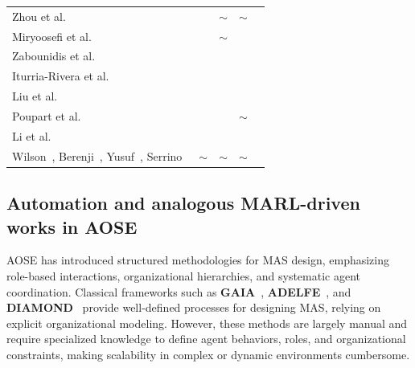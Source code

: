 \documentclass[pdflatex,sn-mathphys-num]{sn-jnl}%
\newcommand{\cmark}{\ding{51}}%
\newcommand{\xmark}{\ding{55}}%
\theoremstyle{thmstyleone}%
\theoremstyle{thmstyletwo}%
\theoremstyle{thmstylethree}%
\begin{document}
\begin{table}[h!]
\begin{tabular}{p{7.5cm}cccc}
        Zhou et al.~\cite{zhou2024mentor}                                                                                          & \xmark      & $\sim$      & $\sim$      & \xmark      \\
        Miryoosefi et al.~\cite{miryoosefi2021}                                                                                    & \xmark      & $\sim$      & \xmark      & \xmark      \\
        Zabounidis et al.~\cite{zabounidis2023concept}                                                                             & \xmark      & \xmark      & \cmark      & \xmark      \\
        Iturria-Rivera et al.~\cite{iturria2024explainable}                                                                        & \xmark      & \xmark      & \cmark      & \xmark      \\
        Liu et al.~\cite{liu2025}                                                                                                  & \xmark      & \xmark      & \cmark      & \xmark      \\
        Poupart et al.~\cite{poupart2025perspectives}                                                                              & \xmark      & \xmark      & $\sim$      & \xmark      \\
        Li et al.~\cite{li2025from}                                                                                                & \xmark      & \xmark      & \cmark      & \xmark      \\
        Wilson~\cite{Williams2004}, Berenji~\cite{Zhang2013}, Yusuf~\cite{yusuf2020inferential}, Serrino~\cite{serrino2019finding} & $\sim$      & $\sim$      & $\sim$      & \xmark      \\
        \bottomrule
    \end{tabular}
\end{table}


\subsection{Automation and analogous MARL-driven works in AOSE}\label{sub-sec:rel_aose_automate_marl}

AOSE has introduced structured methodologies for MAS design, emphasizing role-based interactions, organizational hierarchies, and systematic agent coordination. Classical frameworks such as \textbf{GAIA}~\cite{gaia1998}, \textbf{ADELFE}~\cite{adelfe2002}, and \textbf{DIAMOND}~\cite{Jamont2005} provide well-defined processes for designing MAS, relying on explicit organizational modeling. However, these methods are largely manual and require specialized knowledge to define agent behaviors, roles, and organizational constraints, making scalability in complex or dynamic environments cumbersome.
\end{document}
